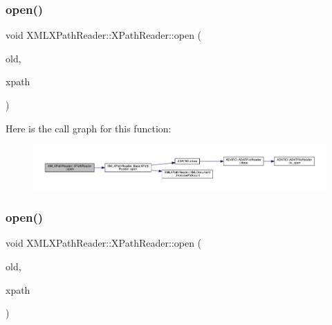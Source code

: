 \subsubsection{\texorpdfstring{open()}{open()}\hspace{0.1cm}{\footnotesize\ttfamily [7/9]}}
{\footnotesize\ttfamily void X\+M\+L\+X\+Path\+Reader\+::\+X\+Path\+Reader\+::open (\begin{DoxyParamCaption}\item[{\mbox{\hyperlink{classXMLXPathReader_1_1XPathReader}{X\+Path\+Reader}} \&}]{old,  }\item[{const std\+::string \&}]{xpath }\end{DoxyParamCaption})\hspace{0.3cm}{\ttfamily [inline]}}

Here is the call graph for this function\+:
\nopagebreak
\begin{figure}[H]
\begin{center}
\leavevmode
\includegraphics[width=350pt]{d3/d5a/classXMLXPathReader_1_1XPathReader_a55e38b40f720bb3622e3489561b1457c_cgraph}
\end{center}
\end{figure}
\mbox{\label{classXMLXPathReader_1_1XPathReader_a55e38b40f720bb3622e3489561b1457c}} 
\subsubsection{\texorpdfstring{open()}{open()}\hspace{0.1cm}{\footnotesize\ttfamily [8/9]}}
{\footnotesize\ttfamily void X\+M\+L\+X\+Path\+Reader\+::\+X\+Path\+Reader\+::open (\begin{DoxyParamCaption}\item[{\mbox{\hyperlink{classXMLXPathReader_1_1XPathReader}{X\+Path\+Reader}} \&}]{old,  }\item[{const std\+::string \&}]{xpath }\end{DoxyParamCaption})\hspace{0.3cm}{\ttfamily [inline]}}

